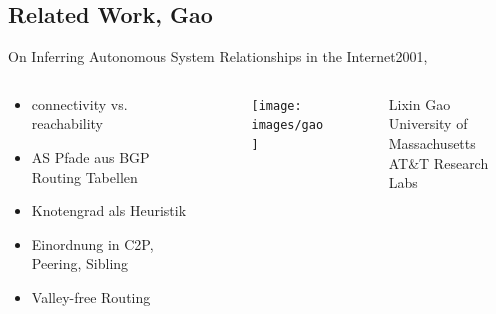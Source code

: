 \documentclass[ngerman,compress,hyperref={bookmarks}]{beamer}
\begin{document}
\subsection{Related Work, Gao}
\begin{frame}{On Inferring Autonomous System Relationships in the Internet}{2001, \cite{Gao:2001:IAS:504611.504616}}
  \begin{columns}[c]
    \begin{column}{0.5\textwidth}
      \begin{itemize}
        \item connectivity vs. reachability
        \item AS Pfade aus BGP Routing Tabellen
        \item Knotengrad als Heuristik
        \item Einordnung in C2P, Peering, Sibling
        \item Valley-free Routing
      \end{itemize}
    \end{column}
    \begin{column}{0.1\textwidth}
      \begin{figure}
        \texttt{[image: images/gao]}
        \label{gao}
      \end{figure}
    \end{column}
    \begin{column}{0.3\textwidth}
      {\scriptsize Lixin Gao\\
      \vspace{0.1cm}
      University of Massachusetts\\
      AT\&T Research Labs\\}
    \end{column}
  \end{columns}
\end{frame}
\end{document}
